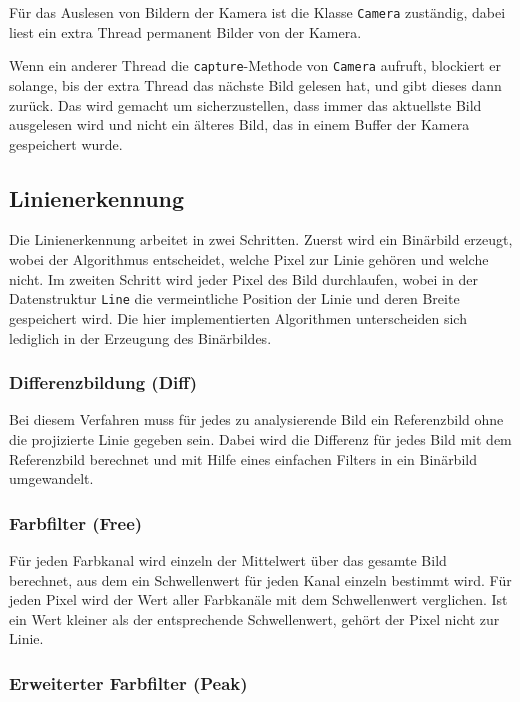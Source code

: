 \documentclass[ngerman,a4paper,parskip=half]{scrartcl}
\begin{document}
Für das Auslesen von Bildern der Kamera ist die Klasse \texttt{Camera} zuständig, dabei liest ein extra Thread permanent Bilder von der Kamera.

Wenn ein anderer Thread die \texttt{capture}-Methode von \texttt{Camera} aufruft, blockiert er solange, bis der extra Thread das nächste Bild gelesen hat, und gibt dieses dann zurück. Das wird gemacht um sicherzustellen, dass immer das aktuellste Bild ausgelesen wird und nicht ein älteres Bild, das in einem Buffer der Kamera gespeichert wurde.


\subsection{Linienerkennung}

Die Linienerkennung arbeitet in zwei Schritten. Zuerst wird ein Binärbild erzeugt, wobei der Algorithmus entscheidet, welche Pixel zur Linie gehören und welche nicht. Im zweiten Schritt wird jeder Pixel des Bild durchlaufen, wobei in der Datenstruktur \texttt{Line} die vermeintliche Position der Linie und deren Breite gespeichert wird. Die hier implementierten Algorithmen unterscheiden sich lediglich in der Erzeugung des Binärbildes.

\subsubsection{Differenzbildung (Diff)}

Bei diesem Verfahren muss für jedes zu analysierende Bild ein Referenzbild ohne die projizierte Linie gegeben sein. Dabei wird die Differenz für jedes Bild mit dem Referenzbild berechnet und mit Hilfe eines einfachen Filters in ein Binärbild umgewandelt.

\subsubsection{Farbfilter (Free)}

Für jeden Farbkanal wird einzeln der Mittelwert über das gesamte Bild berechnet, aus dem ein Schwellenwert für jeden Kanal einzeln bestimmt wird. Für jeden Pixel wird der Wert aller Farbkanäle mit dem Schwellenwert verglichen. Ist ein Wert kleiner als der entsprechende Schwellenwert, gehört der Pixel nicht zur Linie.

\subsubsection{Erweiterter Farbfilter (Peak)}
\end{document}
